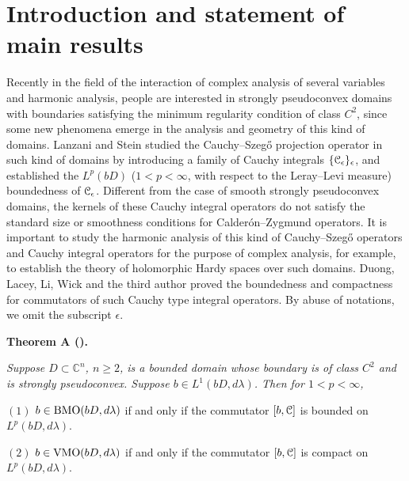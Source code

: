 \documentclass[11pt,a4paper]{amsart}
\numberwithin{equation}{section}
\begin{document}
\maketitle




\section{Introduction and statement of main results}
\setcounter{equation}{0}




\smallskip
Recently in the field of the interaction of complex analysis of several variables and harmonic analysis, people are interested in strongly pseudoconvex domains with boundaries satisfying the minimum regularity condition of class $C^2$, since some new phenomena emerge in the
 analysis and geometry of this kind of domains.
Lanzani and Stein \cite{LS}
 studied the Cauchy--Szeg\H o projection operator  in such kind of domains by introducing
 a family of Cauchy integrals $\{\EuScript C_\epsilon\}_\epsilon$, and established the $L^p(bD)$ ($1<p<\infty$, with respect to the Leray--Levi measure) boundedness  of $\EuScript C_\epsilon$.
 Different from the case of smooth strongly pseudoconvex domains, the kernels of these Cauchy integral operators do not satisfy the standard size or smoothness conditions for Calder\'on--Zygmund operators. It is important to study the harmonic analysis of this kind of Cauchy--Szeg\H o operators and Cauchy integral operators for the purpose of complex analysis, for example, to establish the theory of holomorphic Hardy spaces over such domains.
  Duong, Lacey, Li, Wick and the third author \cite{DLLWW}  proved the  boundedness and compactness for commutators of such Cauchy type integral operators. By abuse of notations, we omit the subscript $\epsilon$.






  \medskip\noindent
{\bf Theorem A (\cite{DLLWW}).} {\it
Suppose $D\subset \mathbb C^n$, $n\geq 2$, is  a bounded domain whose boundary is of class $C^2$ and is strongly pseudoconvex.
Suppose $b\in L^1(bD, d\lambda)$. Then for $1<p<\infty$,

$(1)$  $b\in{\rm BMO}(bD,d\lambda)$ if and only if the commutator $[b, \EuScript C]$ is bounded on  $L^p(bD, d\lambda)$.


$(2)$   $b\in{\rm VMO}(bD,d\lambda)$ if and only if the commutator $[b, \EuScript C]$ is compact on  $L^p(bD, d\lambda)$.


}
\end{document}
